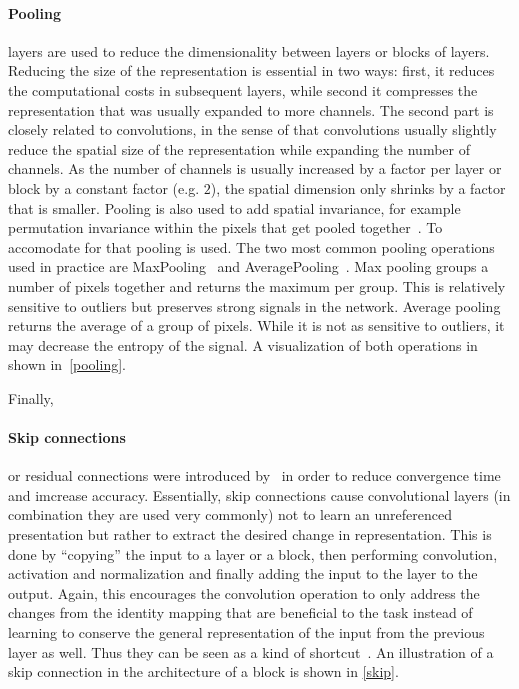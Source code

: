 \paragraph{Pooling} layers are used to reduce the dimensionality between layers or blocks of layers.
Reducing the size of the representation is essential in two ways: first, it reduces the computational costs in subsequent layers, while second it compresses the representation that was usually expanded to more channels.
The second part is closely related to convolutions, in the sense of that convolutions usually slightly reduce the spatial size of the representation while expanding the number of channels.
As the number of channels is usually increased by a factor per layer or block by a constant factor (e.g. $2$), the spatial dimension only shrinks by a factor that is smaller.
Pooling is also used to add spatial invariance, for example permutation invariance within the pixels that get pooled together~\autocite{goodfellow_deep_2016}.
To accomodate for that pooling is used.
The two most common pooling operations used in practice are MaxPooling~\autocite{zhou_computation_1988} and AveragePooling~\autocite{gholamalinezhad_pooling_nodate}.
Max pooling groups a number of pixels together and returns the maximum per group.
This is relatively sensitive to outliers but preserves strong signals in the network.
Average pooling returns the average of a group of pixels.
While it is not as sensitive to outliers, it may decrease the entropy of the signal.
A visualization of both operations in shown in~\ref{pooling}.

Finally, \paragraph{Skip connections} or residual connections were introduced by~\autocite{he_deep_2016} in order to reduce convergence time and imcrease accuracy.
Essentially, skip connections cause convolutional layers (in combination they are used very commonly) not to learn an unreferenced presentation but rather to extract the desired change in representation.
This is done by ``copying'' the input to a layer or a block, then performing convolution, activation and normalization and finally adding the input to the layer to the output.
Again, this encourages the convolution operation to only address the changes from the identity mapping that are beneficial to the task instead of learning to conserve the general representation of the input from the previous layer as well.
Thus they can be seen as a kind of shortcut~\autocite{he_deep_2016}.
An illustration of a skip connection in the architecture of a block is shown in \ref{skip}.



